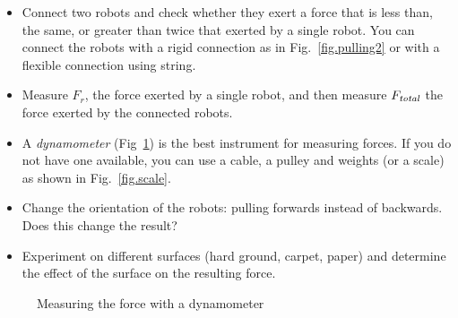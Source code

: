 \begin{framed}
\begin{itemize}
\item Connect two robots and check whether they exert a force that is less than, the same, or greater than twice that exerted by a single robot. You can connect the robots with a rigid connection as in Fig.~\ref{fig.pulling2} or with a flexible connection using string.
\item Measure $F_r$, the force exerted by a single robot, and then measure $F_{\textit{\scriptsize total}}$ the force exerted by the connected robots.
\item A \emph{dynamometer} (Fig~\ref{fig.dyna}) is the best instrument for measuring forces. If you do not have one available, you can use a cable, a pulley and weights (or a scale) as shown in Fig.~\ref{fig.scale}.
\item Change the orientation of the robots: pulling forwards instead of backwards. Does this change the result?
\item Experiment on different surfaces (hard ground, carpet, paper) and determine the effect of the surface on the resulting force.
\end{itemize}
\end{framed}

\begin{figure}
\begin{center}
\caption{Measuring the force with a dynamometer}\label{fig.dyna}
\end{center}
\end{figure}

